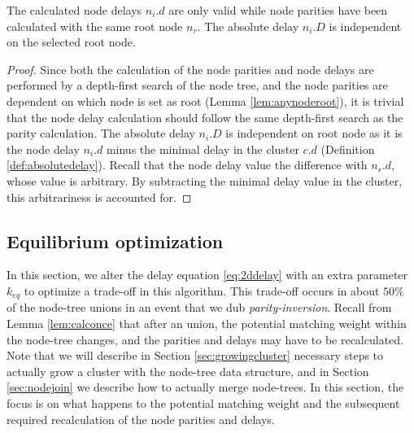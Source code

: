 \begin{lemma}\label{lem:nodecalc_ancestrypath}
  The calculated node delays $n_i.d$ are only valid while node parities have been calculated with the same root node $n_r$. The absolute delay $n_i.D$ is independent on the selected root node. 
\end{lemma}
\begin{proof}
  Since both the calculation of the node parities and node delays are performed by a depth-first search of the node tree, and the node parities are dependent on which node is set as root (Lemma \ref{lem:anynoderoot}), it is trivial that the node delay calculation should follow the same depth-first search as the parity calculation. The absolute delay $n_i.D$ is independent on root node as it is the node delay $n_i.d$ minus the minimal delay in the cluster $c.d$ (Definition \ref{def:absolutedelay}). Recall that the node delay value the difference with $n_r.d$, whose value is arbitrary. By subtracting the minimal delay value in the cluster, this arbitrariness is accounted for. 
\end{proof}



\subsection{Equilibrium optimization}\label{sec:eqstate}

In this section, we alter the delay equation \eqref{eq:2ddelay} with an extra parameter $k_{eq}$ to optimize a trade-off in this algorithm. This trade-off occurs in about $50\%$ of the node-tree unions in an event that we dub \emph{parity-inversion}. Recall from Lemma \ref{lem:calconce} that after an union, the potential matching weight within the node-tree changes, and the parities and delays may have to be recalculated. Note that we will describe in Section \ref{sec:growingcluster} necessary steps to actually grow a cluster with the node-tree data structure, and in Section \ref{sec:nodejoin} we describe how to actually merge node-trees. In this section, the focus is on what happens to the potential matching weight and the subsequent required recalculation of the node parities and delays. 

